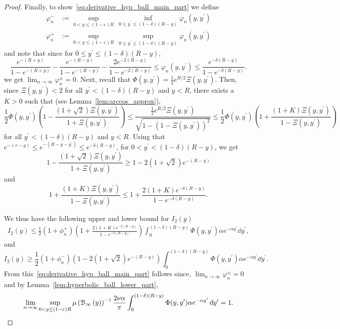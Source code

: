 \begin{proof}
Finally, to show~\eqref{eq:derivative_hyp_ball_main_part} we define 
\begin{align*}
	\varphi^-_n &:= \sup_{0 < y \le (1-\varepsilon)R} \, \inf_{0 \le y^\prime \le (1 - \delta)(R-y)} 
		\varphi_n(y,y^\prime)\\
	\varphi^+_n &:= \sup_{0 < y \le (1-\varepsilon)R} \, \sup_{0 \le y^\prime \le (1 - \delta)(R-y)} \varphi_n(y,y^\prime)
\end{align*}
and note that since for $0 \le y^\prime \le (1-\delta)(R-y)$,
\[
	\frac{e^{-(R + y)}}{1 - e^{-(R+y)}} - \frac{e^{-(R- y)}}{1 - e^{-(R-y)}} - \frac{2e^{-2(R-y)}}{1 - e^{-2(R-y)}}
	\le \varphi_n(y,y^\prime) \le \frac{e^{-\delta(R-y)}}{1 - e^{-\delta(R-y)}}.
\] 
we get $\lim_{n \to \infty} \varphi^\pm_n = 0$. Next, recall that $\Phi(y,y^\prime) = \frac{1}{2}e^{R/2}\Xi(y,y^\prime)$. Then, since $\Xi(y,y^\prime) < 2$ for all $y^\prime < (1-\delta)(R-y)$ and $y < R$, there exists a $K > 0$ such that (see Lemma~\ref{lem:arccos_approx}),
\[
	\frac{1}{2}\Phi(y,y^\prime)\left(1 - \frac{(1+\sqrt{2})\Xi(y,y^\prime)}{1 + \Xi(y,y^\prime)}\right)
	\le \frac{\frac{1}{2}e^{R/2} \Xi(y,y^\prime)}{\sqrt{1 - \left(1 - \Xi(y,y^\prime)\right)^2}} 
	\le \frac{1}{2}\Phi(y,y^\prime)\left(1 + \frac{(1+K)\Xi(y,y^\prime)}{1 - \Xi(y,y^\prime)}\right)
\]
for all $y^\prime < (1-\delta)(R - y)$ and $y < R$. Using that $e^{-(r-y)} \le e^{-(R - y - y^\prime)} \le e^{-\delta(R- y)}$, for $0 < y^\prime < (1-\delta)(R-y)$, we get
\[
	1 - \frac{(1+\sqrt{2})\Xi(y,y^\prime)}{1 + \Xi(y,y^\prime)} \ge 1 - 2(1+\sqrt{2})e^{-(R-y)}
\]
and
\[
	1 + \frac{(1+K)\Xi(y,y^\prime)}{1 - \Xi(y,y^\prime)} 
	\le 1 + \frac{2(1 + K)e^{-\delta(R - y)}}{1-e^{-\delta(R-y)}}.
\]

We thus have the following upper and lower bound for $I_2(y)$
\begin{align*}
	I_2(y) \le \frac{1}{2} \left(1 + \phi_n^+\right)
	\left(1 + \frac{2(1 + K)e^{-\delta(R - y)}}{1-e^{-\delta(R-y)}}\right)
	\int_{0}^{(1-\delta)(R-y)} \Phi(y,y^\prime) \alpha e^{-\alpha y^\prime} \dd y^\prime,
\end{align*}
and
\[
	I_2(y) \ge \frac{1}{2} \left(1 + \phi_n^-\right)\left(1 - 2(1+\sqrt{2})e^{-(R-y)}\right)
	\int_{0}^{(1-\delta)(R-y)} \Phi(y,y^\prime) \alpha e^{-\alpha y^\prime} \dd y^\prime.
\]
From this~\eqref{eq:derivative_hyp_ball_main_part} follows since, $\lim_{n \to \infty} \varphi_n^\pm = 0$ and by Lemma~\ref{lem:hyperbolic_ball_lower_part},
\[
	\lim_{n \to \infty} \sup_{0 < y \le (1-\varepsilon)R} \mu\left({\mathcal B}_{\infty}\left(y\right)\right)^{-1} \frac{2\nu \alpha}{\pi} 
	\int_{0}^{(1-\delta)(R-y)} \Phi(y,y^\prime) \alpha e^{-\alpha y^\prime} \operatorname{\mathrm{d}\hspace{-2pt}} y^\prime
	= 1.
\] 
\end{proof}

